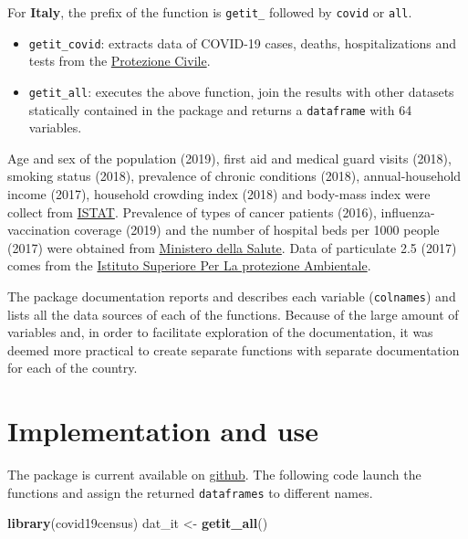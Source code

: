 \documentclass[12pt,halfline,a4paper,]{ouparticle}
\newenvironment{Shaded}{\begin{snugshade}}{\end{snugshade}}
\newcommand{\KeywordTok}[1]{\textcolor[rgb]{0.13,0.29,0.53}{\textbf{#1}}}
\newcommand{\NormalTok}[1]{#1}
\newcommand{\StringTok}[1]{\textcolor[rgb]{0.31,0.60,0.02}{#1}}
\providecommand{\tightlist}{%
  \setlength{\itemsep}{0pt}\setlength{\parskip}{0pt}}
\begin{document}
For \textbf{Italy}, the prefix of the function is \texttt{getit\_}
followed by \texttt{covid} or \texttt{all}.

\begin{itemize}
\tightlist
\item
  \texttt{getit\_covid}: extracts data of COVID-19 cases, deaths,
  hospitalizations and tests from the
  \href{\%22https://raw.githubusercontent.com/pcm-dpc/COVID-19/master/dati-regioni/dpc-covid19-ita-regioni.csv\%22}{Protezione
  Civile}.
\item
  \texttt{getit\_all}: executes the above function, join the results
  with other datasets statically contained in the package and returns a
  \texttt{dataframe} with 64 variables.
\end{itemize}

Age and sex of the population (2019), first aid and medical guard visits
(2018), smoking status (2018), prevalence of chronic conditions (2018),
annual-household income (2017), household crowding index (2018) and
body-mass index were collect from
\href{http://dati.istat.it/?lang=en}{ISTAT}. Prevalence of types of
cancer patients (2016), influenza-vaccination coverage (2019) and the
number of hospital beds per 1000 people (2017) were obtained from
\href{http://www.dati.salute.gov.it/}{Ministero della Salute}. Data of
particulate 2.5 (2017) comes from the
\href{https://annuario.isprambiente.it/pon/basic/14}{Istituto Superiore
Per La protezione Ambientale}.

The package documentation reports and describes each variable
(\texttt{colnames}) and lists all the data sources of each of the
functions. Because of the large amount of variables and, in order to
facilitate exploration of the documentation, it was deemed more
practical to create separate functions with separate documentation for
each of the country.

\hypertarget{implementation-and-use}{%
\section{Implementation and use}\label{implementation-and-use}}

The package is current available on
\href{https://github.com/c1au6i0/covid19census}{github}. The following
code launch the functions and assign the returned \texttt{dataframes} to
different names.

\bigskip

\begin{Shaded}
\begin{Highlighting}[]
\KeywordTok{library}\NormalTok{(covid19census)}
\NormalTok{dat_it <-}\StringTok{ }\KeywordTok{getit_all}\NormalTok{()}
\end{Highlighting}
\end{Shaded}
\end{document}
